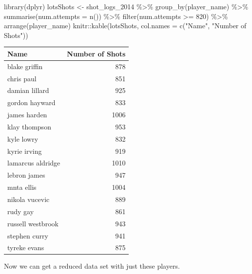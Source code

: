 \documentclass[
]{book}
\newenvironment{Shaded}{\begin{snugshade}}{\end{snugshade}}
\newcommand{\AttributeTok}[1]{\textcolor[rgb]{0.77,0.63,0.00}{#1}}
\newcommand{\DecValTok}[1]{\textcolor[rgb]{0.00,0.00,0.81}{#1}}
\newcommand{\FunctionTok}[1]{\textcolor[rgb]{0.00,0.00,0.00}{#1}}
\newcommand{\NormalTok}[1]{#1}
\newcommand{\OtherTok}[1]{\textcolor[rgb]{0.56,0.35,0.01}{#1}}
\newcommand{\SpecialCharTok}[1]{\textcolor[rgb]{0.00,0.00,0.00}{#1}}
\newcommand{\StringTok}[1]{\textcolor[rgb]{0.31,0.60,0.02}{#1}}
\theoremstyle{definition}
\theoremstyle{definition}
\theoremstyle{definition}
\theoremstyle{definition}
\theoremstyle{remark}
\begin{document}
\begin{Shaded}
\begin{Highlighting}[]
\FunctionTok{library}\NormalTok{(dplyr)}
\NormalTok{lotsShots }\OtherTok{\textless{}{-}}\NormalTok{ shot\_logs\_2014 }\SpecialCharTok{\%\textgreater{}\%}
    \FunctionTok{group\_by}\NormalTok{(player\_name) }\SpecialCharTok{\%\textgreater{}\%}
    \FunctionTok{summarise}\NormalTok{(}\AttributeTok{num.attempts =} \FunctionTok{n}\NormalTok{()) }\SpecialCharTok{\%\textgreater{}\%}
    \FunctionTok{filter}\NormalTok{(num.attempts }\SpecialCharTok{\textgreater{}=} \DecValTok{820}\NormalTok{) }\SpecialCharTok{\%\textgreater{}\%}
    \FunctionTok{arrange}\NormalTok{(player\_name)}
\NormalTok{knitr}\SpecialCharTok{::}\FunctionTok{kable}\NormalTok{(lotsShots, }\AttributeTok{col.names =} \FunctionTok{c}\NormalTok{(}\StringTok{"Name"}\NormalTok{, }\StringTok{"Number of Shots"}\NormalTok{))}
\end{Highlighting}
\end{Shaded}

\begin{tabular}{l|r}
\hline
Name & Number of Shots\\
\hline
blake griffin & 878\\
\hline
chris paul & 851\\
\hline
damian lillard & 925\\
\hline
gordon hayward & 833\\
\hline
james harden & 1006\\
\hline
klay thompson & 953\\
\hline
kyle lowry & 832\\
\hline
kyrie irving & 919\\
\hline
lamarcus aldridge & 1010\\
\hline
lebron james & 947\\
\hline
mnta ellis & 1004\\
\hline
nikola vucevic & 889\\
\hline
rudy gay & 861\\
\hline
russell westbrook & 943\\
\hline
stephen curry & 941\\
\hline
tyreke evans & 875\\
\hline
\end{tabular}

Now we can get a reduced data set with just these players.

\begin{Shaded}
\end{Shaded}
\end{document}
